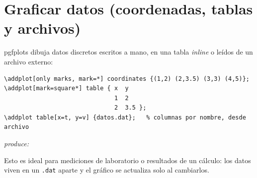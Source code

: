 \documentclass[11pt,a4paper]{article}
\newcommand{\pkg}[1]{\textsf{#1}}
\newcommand{\produce}{\par\smallskip\noindent\textit{produce:}\par\smallskip}
\begin{document}
\section{Graficar datos (coordenadas, tablas y archivos)}
\pkg{pgfplots} dibuja datos discretos escritos a mano, en una tabla \emph{inline}
o leídos de un archivo externo:
\begin{lstlisting}
\addplot[only marks, mark=*] coordinates {(1,2) (2,3.5) (3,3) (4,5)};
\addplot[mark=square*] table { x  y
                               1  2
                               2  3.5 };
\addplot table[x=t, y=v] {datos.dat};   % columnas por nombre, desde archivo
\end{lstlisting}
\produce
\begin{center}
\end{center}
Esto es ideal para mediciones de laboratorio o resultados de un cálculo: los datos
viven en un \texttt{.dat} aparte y el gráfico se actualiza solo al cambiarlos.

\end{document}
